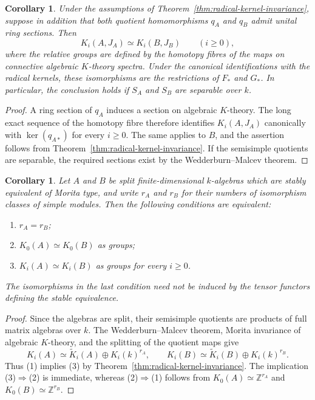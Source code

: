 \documentclass[12pt,a4paper,english,reqno]{amsart}
\numberwithin{equation}{section}
\theoremstyle{plain}
\newtheorem{corollary}[theorem]{Corollary}
\theoremstyle{definition}
\begin{document}
\begin{corollary}\label{cor:radical-relative-k}
Under the assumptions of Theorem~\ref{thm:radical-kernel-invariance},
suppose in addition that both quotient homomorphisms $q_A$ and $q_B$
admit unital ring sections. Then
\[
 K_i(A,J_A)\simeq K_i(B,J_B)\qquad(i\geq0),
\]
where the relative groups are defined by the homotopy fibres of the
maps on connective algebraic $K$-theory spectra. Under the canonical
identifications with the radical kernels, these isomorphisms are
the restrictions of $F_*$ and $G_*$. In particular, the conclusion
holds if $S_A$ and $S_B$ are separable over $k$.
\end{corollary}

\begin{proof}
A ring section of $q_A$ induces a section on algebraic $K$-theory.
The long exact sequence of the homotopy fibre therefore identifies
$K_i(A,J_A)$ canonically with $\ker(q_{A*})$ for every $i\geq0$.
The same applies to $B$, and the assertion follows from
Theorem~\ref{thm:radical-kernel-invariance}. If the semisimple
quotients are separable, the required sections exist by the
Wedderburn--Malcev theorem.
\end{proof}

\begin{corollary}\label{cor:ordinary-k-simple-count}
Let $A$ and $B$ be split finite-dimensional $k$-algebras which are
stably equivalent of Morita type, and write $r_A$ and $r_B$ for
their numbers of isomorphism classes of simple modules. Then the
following conditions are equivalent:
\begin{enumerate}
\item $r_A=r_B$;
\item $K_0(A)\simeq K_0(B)$ as groups;
\item $K_i(A)\simeq K_i(B)$ as groups for every $i\geq0$.
\end{enumerate}
The isomorphisms in the last condition need not be induced by
the tensor functors defining the stable equivalence.
\end{corollary}

\begin{proof}
Since the algebras are split, their semisimple quotients are
products of full matrix algebras over $k$. The Wedderburn--Malcev
theorem, Morita invariance of algebraic $K$-theory, and the splitting
of the quotient maps give
\[
 K_i(A)\simeq\widetilde K_i(A)\oplus K_i(k)^{r_A},
 \qquad
 K_i(B)\simeq\widetilde K_i(B)\oplus K_i(k)^{r_B}.
\]
Thus (1) implies (3) by Theorem~\ref{thm:radical-kernel-invariance}.
The implication (3)$\Rightarrow$(2) is immediate, whereas
(2)$\Rightarrow$(1) follows from
$K_0(A)\simeq\mathbb Z^{r_A}$ and
$K_0(B)\simeq\mathbb Z^{r_B}$.
\end{proof}
\end{document}
